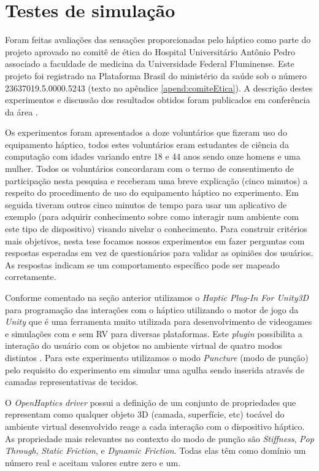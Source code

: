 \chapter{Testes de simulação} \label{cap:cap5}

Foram feitas avaliações das sensações proporcionadas pelo háptico como parte do projeto aprovado no comitê de ética do Hospital Universitário Antônio Pedro associado a faculdade de medicina da Universidade Federal Fluminense. Este projeto foi registrado na Plataforma Brasil do ministério da saúde sob o número 23637019.5.0000.5243 (texto no apêndice \ref{apend:comiteEtica}). A descrição destes experimentos e discussão dos resultados obtidos foram publicados em conferência da área \cite{Melo2021}.

Os experimentos foram apresentados a doze voluntários que fizeram uso do equipamento háptico, todos estes voluntários eram estudantes de ciência da computação com idades variando entre 18 e 44 anos sendo onze homens e uma mulher. Todos os voluntários concordaram com o termo de consentimento de participação nesta pesquisa e receberam uma breve explicação (cinco minutos) a respeito do procedimento de uso do equipamento háptico no experimento. Em seguida tiveram outros cinco minutos de tempo para usar um aplicativo de exemplo (para adquirir conhecimento sobre como interagir num ambiente com este tipo de dispositivo) visando nivelar o conhecimento. Para construir critérios mais objetivos, nesta tese focamos nossos experimentos em fazer perguntas com respostas esperadas em vez de questionários para validar as opiniões dos usuários. As respostas indicam se um comportamento específico pode ser mapeado corretamente.

Conforme comentado na seção anterior utilizamos o \textit{Haptic Plug-In For Unity3D} para programação das interações com o háptico utilizando o motor de jogo da \textit{Unity} \cite{UnityTechnologies2020} que é uma ferramenta muito utilizada para desenvolvimento de videogames e simulações com e sem \acrshort{RV} para diversas plataformas.
Este \textit{plugin} possibilita a interação do usuário com os objetos no ambiente virtual  de quatro modos distintos \cite{Poyade2014}. Para este experimento utilizamos o modo \textit{Puncture} (modo de punção) pelo requisito do experimento em simular uma agulha sendo inserida através de camadas representativas de tecidos.

O \textit{OpenHaptics driver} possui a definição de um conjunto de propriedades que representam como qualquer objeto 3D (camada, superfície, etc) tocável do ambiente virtual desenvolvido reage a cada interação com o dispositivo háptico. As propriedade mais relevantes no contexto do modo de punção são \textit{Stiffness}, \textit{Pop Through}, \textit{Static Friction}, e \textit{Dynamic Friction}. Todas elas têm como domínio um número real e aceitam valores entre zero e um. 

